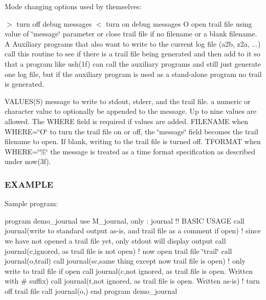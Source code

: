 Mode changing options used by themselves\+:

$>$ turn off debug messages $<$ turn on debug messages O open trail file using value of \char`\"{}message\char`\"{} parameter or close trail file if no filename or a blank filename. A Auxiliary programs that also want to write to the current log file (a2b, z2a, ...) call this routine to see if there is a trail file being generated and then add to it so that a program like ush(1f) can call the auxiliary programs and still just generate one log file, but if the auxiliary program is used as a stand-\/alone program no trail is generated.

V\+A\+L\+U\+E\+S(\+S) message to write to stdout, stderr, and the trail file. a numeric or character value to optionally be appended to the message. Up to nine values are allowed. The W\+H\+E\+RE field is required if values are added. F\+I\+L\+E\+N\+A\+ME when W\+H\+E\+RE=\char`\"{}\+O\char`\"{} to turn the trail file on or off, the \char`\"{}message\char`\"{} field becomes the trail filename to open. If blank, writing to the trail file is turned off. T\+F\+O\+R\+M\+AT when W\+H\+E\+RE=\char`\"{}\%\char`\"{} the message is treated as a time format specification as described under now(3f).

\subsubsection*{E\+X\+A\+M\+P\+LE}

Sample program\+:

program demo\+\_\+journal use M\+\_\+journal, only \+: journal !! B\+A\+S\+IC U\+S\+A\+GE call journal(\textquotesingle{}write to standard output as-\/is, and trail file as a comment if open\textquotesingle{}) ! since we have not opened a trail file yet, only stdout will display output call journal(\textquotesingle{}c\textquotesingle{},\textquotesingle{}ignored, as trail file is not open\textquotesingle{}) ! now open trail file \char`\"{}trail\char`\"{} call journal(\textquotesingle{}o\textquotesingle{},\textquotesingle{}trail\textquotesingle{}) call journal(\textquotesingle{}sc\textquotesingle{},\textquotesingle{}same thing except now trail file is open\textquotesingle{}) ! only write to trail file if open call journal(\textquotesingle{}c\textquotesingle{},\textquotesingle{}not ignored, as trail file is open. Written with \# suffix\textquotesingle{}) call journal(\textquotesingle{}t\textquotesingle{},\textquotesingle{}not ignored, as trail file is open. Written as-\/is\textquotesingle{}) ! turn off trail file call journal(\textquotesingle{}o\textquotesingle{},\textquotesingle{}\textquotesingle{}) end program demo\+\_\+journal

